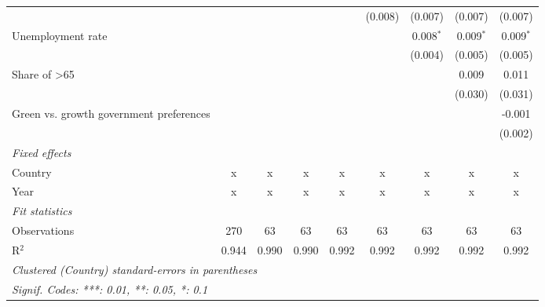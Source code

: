 \begin{table}[htbp]
\begin{tabular}{lcccccccc}
                                                                              &         &         &         &             & (0.008)     & (0.007)     & (0.007)     & (0.007)\\   
      Unemployment rate                                                       &         &         &         &             &             & 0.008$^{*}$ & 0.009$^{*}$ & 0.009$^{*}$\\   
                                                                              &         &         &         &             &             & (0.004)     & (0.005)     & (0.005)\\   
      Share of >65                                                            &         &         &         &             &             &             & 0.009       & 0.011\\   
                                                                              &         &         &         &             &             &             & (0.030)     & (0.031)\\   
      Green vs. growth government preferences                                 &         &         &         &             &             &             &             & -0.001\\   
                                                                              &         &         &         &             &             &             &             & (0.002)\\   
      \emph{Fixed effects}\\
      Country                                                                 & x       & x       & x       & x           & x           & x           & x           & x\\  
      Year                                                                    & x       & x       & x       & x           & x           & x           & x           & x\\  
      \midrule \emph{Fit statistics}\\
      Observations                                                            & 270     & 63      & 63      & 63          & 63          & 63          & 63          & 63\\  
      R$^2$                                                                   & 0.944   & 0.990   & 0.990   & 0.992       & 0.992       & 0.992       & 0.992       & 0.992\\  
      \midrule
      \multicolumn{9}{l}{\emph{Clustered (Country) standard-errors in parentheses}}\\
      \multicolumn{9}{l}{\emph{Signif. Codes: ***: 0.01, **: 0.05, *: 0.1}}\\
   \end{tabular}
\end{table}


